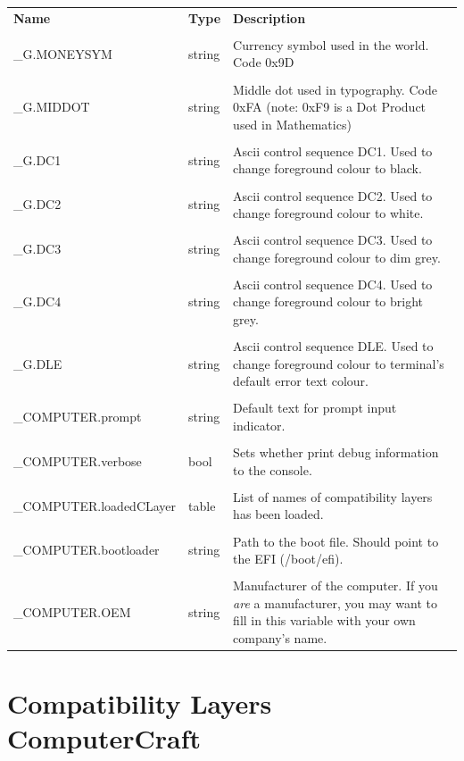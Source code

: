 \documentclass[10pt, stock]{memoir}
\newcommand{\unemph}[1]{\textcolor{brightgrey}{#1}}
\begin{document}
\begin{tabularx}{\textwidth}{l l X}
	\textbf{\large Name} & \textbf{\large Type} & \textbf{\large Description}
	\\ \\
	\endhead
	\unemph{\_G.}MONEYSYM & string & Currency symbol used in the world. Code 0x9D
	\\ \\
	\unemph{\_G.}MIDDOT & string & Middle dot used in typography. Code 0xFA (note: 0xF9 is a Dot Product used in Mathematics)
	\\ \\
	\unemph{\_G.}DC1 & string & Ascii control sequence DC1. Used to change foreground colour to black.
	\\ \\
	\unemph{\_G.}DC2 & string & Ascii control sequence DC2. Used to change foreground colour to white.
	\\ \\
	\unemph{\_G.}DC3 & string & Ascii control sequence DC3. Used to change foreground colour to dim grey.
	\\ \\
	\unemph{\_G.}DC4 & string & Ascii control sequence DC4. Used to change foreground colour to bright grey.
	\\ \\
	\unemph{\_G.}DLE & string & Ascii control sequence DLE. Used to change foreground colour to terminal's default error text colour.
	\\ \\
	\_COMPUTER.prompt & string & Default text for prompt input indicator.
	\\ \\
	\_COMPUTER.verbose & bool & Sets whether print debug information to the console.
	\\ \\
	\_COMPUTER.loadedCLayer & table & List of names of compatibility layers has been loaded.
	\\ \\
	\_COMPUTER.bootloader & string & Path to the boot file. Should point to the EFI (/boot/efi).
	\\ \\
	\_COMPUTER.OEM & string & Manufacturer of the computer. If you \emph{are} a manufacturer, you may want to fill in this variable with your own company's name.
\end{tabularx}


\chapter[Compatibility Layers---ComputerCraft]{{\LARGE Compatibility Layers} \\ ComputerCraft}
\end{document}
